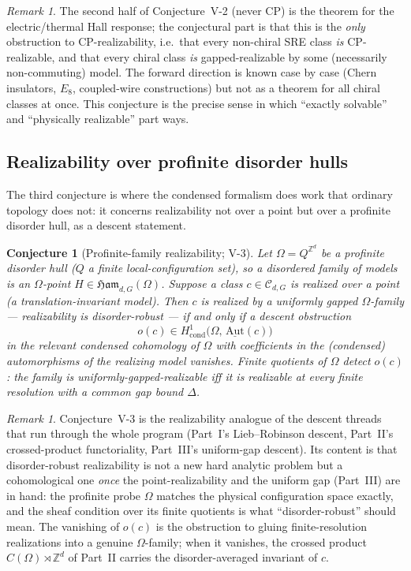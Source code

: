 \documentclass[12pt]{article}
\newcommand{\Ham}{\mathfrak{Ham}}              %
\newcommand{\gapbound}{\Delta}                  %
\newcommand{\dis}{\Omega}                       %
\newcommand{\CP}{\mathrm{CP}}                    %
\newcommand{\Zint}{\mathbb{Z}}
\newtheorem{conjecture}[theorem]{Conjecture}
\theoremstyle{definition}
\theoremstyle{remark}
\newtheorem{remark}[theorem]{Remark}
\begin{document}
\begin{remark}
The second half of Conjecture~V-2 (never $\CP$) is the theorem  for the
electric/thermal Hall response; the conjectural part is that this is the \emph{only}
obstruction to $\CP$-realizability, i.e.\ that every non-chiral SRE class \emph{is}
$\CP$-realizable, and that every chiral class \emph{is} gapped-realizable by some (necessarily
non-commuting) model. The forward direction is known case by case (Chern insulators, $E_8$,
coupled-wire constructions) but not as a theorem for all chiral classes at once. This
conjecture is the precise sense in which ``exactly solvable'' and ``physically realizable''
part ways.
\end{remark}

\subsection{Realizability over profinite disorder hulls}

The third conjecture is where the condensed formalism does work that ordinary topology does
not: it concerns realizability not over a point but over a profinite disorder hull, as a
descent statement.

\begin{conjecture}[Profinite-family realizability; V-3]
\label{conj:V3}
Let $\dis=Q^{\Zint^d}$ be a profinite disorder hull ($Q$ a finite local-configuration set), so
a disordered family of models is an $\dis$-point $H\in\Ham_{d,G}(\dis)$. Suppose a class
$c\in\mathcal{C}_{d,G}$ is realized over a point (a translation-invariant model). Then $c$ is
realized by a \emph{uniformly gapped} $\dis$-family --- realizability is disorder-robust ---
if and only if a descent obstruction
\[
  o(c)\in H^1_{\mathrm{cond}}\bigl(\dis,\, \underline{\mathrm{Aut}}(c)\bigr)
\]
in the relevant condensed cohomology of $\dis$ with coefficients in the (condensed)
automorphisms of the realizing model vanishes. Finite quotients of $\dis$ detect $o(c)$: the
family is uniformly-gapped-realizable iff it is realizable at every finite resolution with a
common gap bound $\gapbound$.
\end{conjecture}

\begin{remark}
Conjecture~V-3 is the realizability analogue of the descent threads that run through the
whole program (Part~I's Lieb--Robinson descent, Part~II's crossed-product functoriality,
Part~III's uniform-gap descent). Its content is that disorder-robust realizability is not a
new hard analytic problem but a cohomological one \emph{once} the point-realizability and the
uniform gap (Part~III) are in hand: the profinite probe $\dis$ matches the physical
configuration space exactly, and the sheaf condition over its finite quotients is what
``disorder-robust'' should mean. The vanishing of $o(c)$ is the obstruction to gluing
finite-resolution realizations into a genuine $\dis$-family; when it vanishes, the crossed
product $C(\dis)\rtimes\Zint^d$ of Part~II \cite{bellissard-ncg-qhe,kellendonk-tilings}
carries the disorder-averaged invariant of $c$.
\end{remark}
\end{document}
